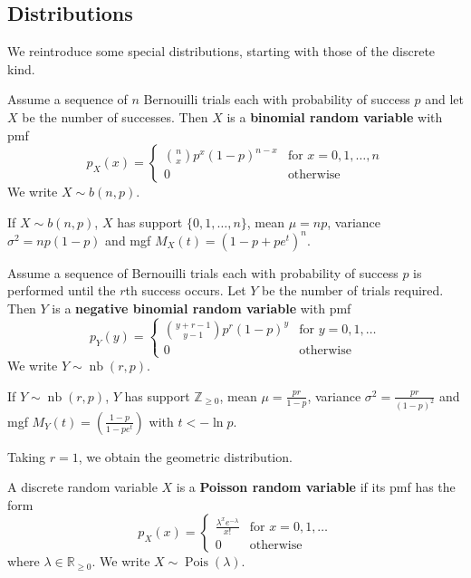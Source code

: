 \subsection{Distributions}

We reintroduce some special distributions, starting with those of the discrete kind.

\begin{definition}
	Assume a sequence of $n$ Bernouilli trials each with probability of success $p$ and let $X$ be the number of successes. Then $X$ is a \textbf{binomial random variable} with pmf $$p_X(x)=\begin{cases}
		\binom{n}{x}p^x(1-p)^{n-x} & \text{for $x=0,1,\hdots,n$}\\
		0 & \text{otherwise}
	\end{cases}$$
	We write $X\sim b(n,p)$.
\end{definition}

If $X\sim b(n,p)$, $X$ has support $\{0,1,\hdots,n\}$, mean $\mu=np$, variance $\sigma^2=np(1-p)$ and mgf $M_X(t)=(1-p+pe^t)^n$.

\begin{definition}
	Assume a sequence of Bernouilli trials each with probability of success $p$ is performed until the $r$th success occurs. Let $Y$ be the number of trials required. Then $Y$ is a \textbf{negative binomial random variable} with pmf $$p_Y(y)=\begin{cases}
		\binom{y+r-1}{y-1}p^r(1-p)^y & \text{for $y=0,1,\hdots$}\\
		0 & \text{otherwise}
	\end{cases}$$
	We write $Y\sim \mathop{nb}(r,p)$.
\end{definition}

If $Y\sim \mathop{nb}(r,p)$, $Y$ has support $\mathbb Z_{\geq 0}$, mean $\mu=\frac{pr}{1-p}$, variance $\sigma^2=\frac{pr}{(1-p)^2}$ and mgf $M_Y(t)=\left(\frac{1-p}{1-pe^t}\right)$ with $t<-\ln p$.

Taking $r=1$, we obtain the geometric distribution.

\begin{definition}
	A discrete random variable $X$ is a \textbf{Poisson random variable} if its pmf has the form $$p_X(x)=\begin{cases}
		\frac{\lambda^xe^{-\lambda}}{x!} & \text{for $x=0,1,\hdots$}\\
		0 & \text{otherwise}
	\end{cases}$$
	where $\lambda\in\mathbb R_{\geq 0}$. We write $X\sim \operatorname{Pois}(\lambda)$.
\end{definition}

